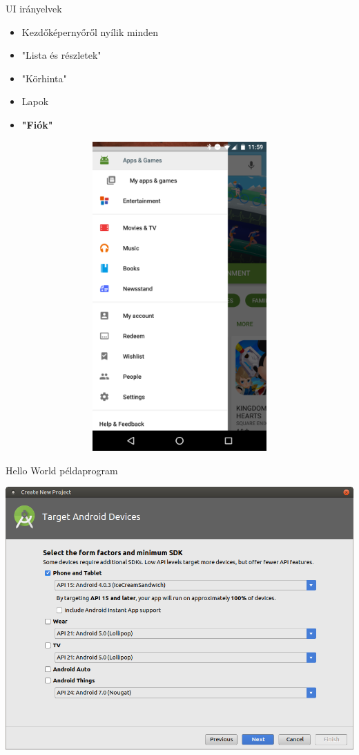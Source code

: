 \documentclass{beamer}
\begin{document}
\begin{frame}[fragile]{UI irányelvek}
	\begin{minipage}{0.34\textwidth}
		\begin{itemize}
			\item Kezdőképernyőről nyílik minden 
			\item "Lista és részletek"
			\item "Körhinta"
			\item Lapok
			\item \textbf{"Fiók"}
		\end{itemize}
	\end{minipage}
	\begin{minipage}{0.65\textwidth}
		\begin{itemize}
			\includegraphics[width=1\linewidth]{figures/drawer.png}
		\end{itemize}
	\end{minipage}
\end{frame}
\begin{frame}[fragile]{Hello World példaprogram}
	\begin{minipage}{1\textwidth}
		\centering
		\includegraphics[width=1\linewidth]{figures/hw1.png}
	\end{minipage}
\end{frame}
\end{document}
